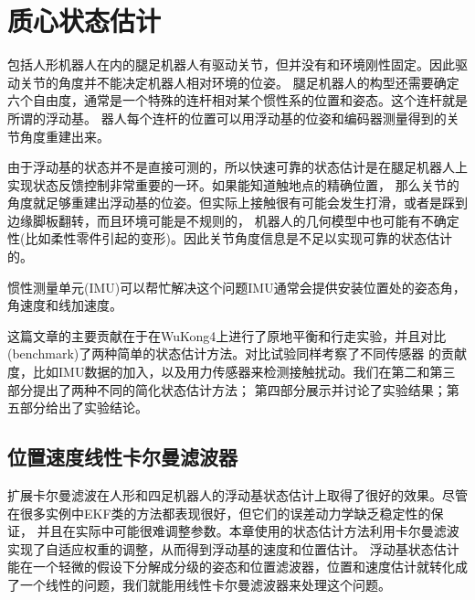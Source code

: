 \section{质心状态估计}
\label{sec:com_est}
包括人形机器人在内的腿足机器人有驱动关节，但并没有和环境刚性固定。因此驱动关节的角度并不能决定机器人相对环境的位姿。
腿足机器人的构型还需要确定六个自由度，通常是一个特殊的连杆相对某个惯性系的位置和姿态。这个连杆就是所谓的浮动基。
器人每个连杆的位置可以用浮动基的位姿和编码器测量得到的关节角度重建出来。

由于浮动基的状态并不是直接可测的，所以快速可靠的状态估计是在腿足机器人上实现状态反馈控制非常重要的一环。如果能知道触地点的精确位置，
那么关节的角度就足够重建出浮动基的位姿。但实际上接触很有可能会发生打滑，或者是踩到边缘脚板翻转，而且环境可能是不规则的，
机器人的几何模型中也可能有不确定性(比如柔性零件引起的变形)。因此关节角度信息是不足以实现可靠的状态估计的。

惯性测量单元(IMU)可以帮忙解决这个问题IMU通常会提供安装位置处的姿态角，角速度和线加速度。



这篇文章的主要贡献在于在WuKong4上进行了原地平衡和行走实验，并且对比(benchmark)了两种简单的状态估计方法。对比试验同样考察了不同传感器
的贡献度，比如IMU数据的加入，以及用力传感器来检测接触扰动。我们在第二和第三部分提出了两种不同的简化状态估计方法；
第四部分展示并讨论了实验结果；第五部分给出了实验结论。

\subsection{位置速度线性卡尔曼滤波器}
扩展卡尔曼滤波在人形和四足机器人的浮动基状态估计上取得了很好的效果。尽管在很多实例中EKF类的方法都表现很好，但它们的误差动力学缺乏稳定性的保证，
并且在实际中可能很难调整参数。本章使用的状态估计方法利用卡尔曼滤波实现了自适应权重的调整，从而得到浮动基的速度和位置估计。
浮动基状态估计能在一个轻微的假设下分解成分级的姿态和位置滤波器，位置和速度估计就转化成了一个线性的问题，我们就能用线性卡尔曼滤波器来处理这个问题。

